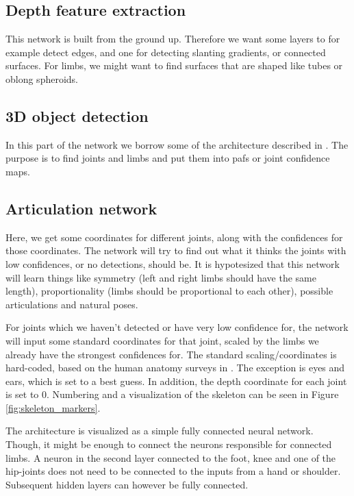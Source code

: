 \subsection{Depth feature extraction}\label{subsec:depth_feature}
This network is built from the ground up. Therefore we want some layers to for example detect edges, and one for detecting slanting gradients, or connected surfaces. For limbs, we might want to find surfaces that are shaped like tubes or oblong spheroids.

\subsection{3D object detection}\label{subsec:obj_detect}
In this part of the network we borrow some of the architecture described in \cite{cao2017realtime}. The purpose is to find joints and limbs and put them into \gls{paf}s or joint confidence maps. 

\subsection{Articulation network}\label{subsec:articulation}
Here, we get some coordinates for different joints, along with the confidences for those coordinates. The network will try to find out what it thinks the joints with low confidences, or no detections, should be. It is hypotesized that this network will learn things like symmetry (left and right limbs should have the same length), proportionality (limbs should be proportional to each other), possible articulations and natural poses.

For joints which we haven't detected or have very low confidence for, the network will input some standard coordinates for that joint, scaled by the limbs we already have the strongest confidences for. The standard scaling/coordinates is hard-coded, based on the human anatomy surveys in \cite{bodySegmentParams}. The exception is eyes and ears, which is set to a best guess. In addition, the depth coordinate for each joint is set to 0. Numbering and a visualization of the skeleton can be seen in Figure \ref{fig:skeleton_markers}.

The architecture is visualized as a simple fully connected neural network. Though, it might be enough to connect the neurons responsible for connected limbs. A neuron in the second layer connected to the foot, knee and one of the hip-joints does not need to be connected to the inputs from a hand or shoulder. Subsequent hidden layers can however be fully connected.

